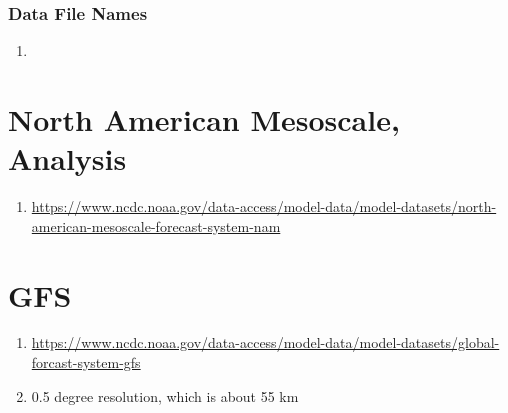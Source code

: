 \subsubsection*{Data File Names}
\begin{enumerate}
\item 
\end{enumerate} 

\section{North American Mesoscale, Analysis}

\begin{enumerate}
\item \url{https://www.ncdc.noaa.gov/data-access/model-data/model-datasets/north-american-mesoscale-forecast-system-nam}

\end{enumerate}

\section{GFS}

\begin{enumerate}
\item \url{https://www.ncdc.noaa.gov/data-access/model-data/model-datasets/global-forcast-system-gfs}
\item 0.5 degree resolution, which is about 55 km %

\end{enumerate}